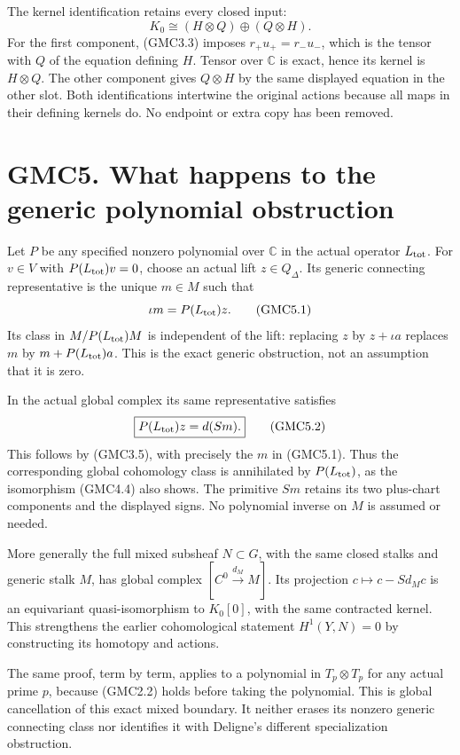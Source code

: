 The kernel identification retains every closed input: \[
K_0\cong(H\otimes Q)\oplus(Q\otimes H).
\tag{GMC4.5}
\] For the first component, (GMC3.3) imposes \(r_+u_+=r_-u_-\), which is
the tensor with \(Q\) of the equation defining \(H\). Tensor over
\(\mathbb C\) is exact, hence its kernel is \(H\otimes Q\). The other
component gives \(Q\otimes H\) by the same displayed equation in the
other slot. Both identifications intertwine the original actions because
all maps in their defining kernels do. No endpoint or extra copy has
been removed.

\section{GMC5. What happens to the generic polynomial
obstruction}\label{gmc5.-what-happens-to-the-generic-polynomial-obstruction}

Let \(P\) be any specified nonzero polynomial over \(\mathbb C\) in the
actual operator \(L_{\rm tot}\). For \(v\in V\) with
\(P(L_{\rm tot})v=0\), choose an actual lift \(z\in Q_\Delta\). Its
generic connecting representative is the unique \(m\in M\) such that \[
\iota m=P(L_{\rm tot})z.
\tag{GMC5.1}
\] Its class in \(M/P(L_{\rm tot})M\) is independent of the lift:
replacing \(z\) by \(z+\iota a\) replaces \(m\) by
\(m+P(L_{\rm tot})a\). This is the exact generic obstruction, not an
assumption that it is zero.

In the actual global complex its same representative satisfies \[
\boxed{P(L_{\rm tot})z=d(Sm).}
\tag{GMC5.2}
\] This follows by (GMC3.5), with precisely the \(m\) in (GMC5.1). Thus
the corresponding global cohomology class is annihilated by
\(P(L_{\rm tot})\), as the isomorphism (GMC4.4) also shows. The
primitive \(Sm\) retains its two plus-chart components and the displayed
signs. No polynomial inverse on \(M\) is assumed or needed.

More generally the full mixed subsheaf \(N\subset G\), with the same
closed stalks and generic stalk \(M\), has global complex
\([C^0\xrightarrow{d_M}M]\). Its projection \(c\mapsto c-Sd_Mc\) is an
equivariant quasi-isomorphism to \(K_0[0]\), with the same contracted
kernel. This strengthens the earlier cohomological statement
\(H^1(Y,N)=0\) by constructing its homotopy and actions.

The same proof, term by term, applies to a polynomial in
\(T_p\otimes T_p\) for any actual prime \(p\), because (GMC2.2) holds
before taking the polynomial. This is global cancellation of this exact
mixed boundary. It neither erases its nonzero generic connecting class
nor identifies it with Deligne's different specialization obstruction.

